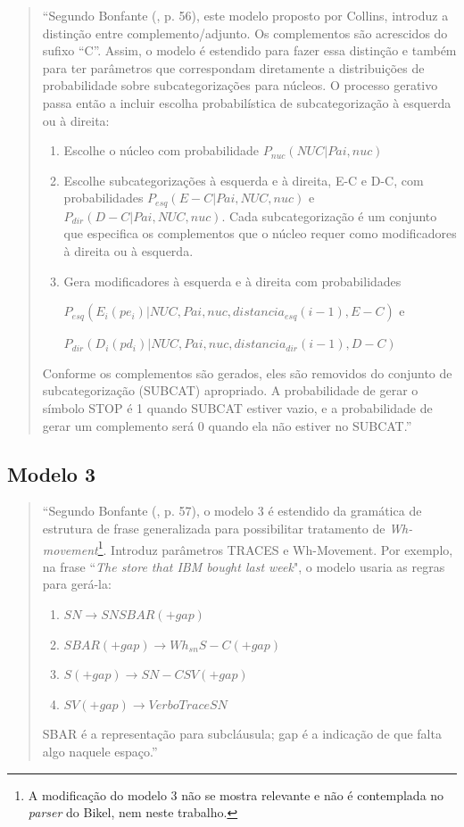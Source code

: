 \begin{quotation}
\footnotesize
``Segundo Bonfante (\cite{bonfante03}, p. 56), este modelo proposto por Collins, introduz a distinção entre complemento/adjunto. Os complementos  são acrescidos do sufixo ``C''. Assim, o modelo é estendido para fazer essa distinção e também para ter parâmetros que correspondam diretamente a distribuições de probabilidade sobre subcategorizações para núcleos.
O processo gerativo passa então a incluir escolha probabilística de subcategorização à esquerda ou à direita:

\begin{enumerate}
  \item Escolhe o núcleo com probabilidade $P_{nuc}(NUC|Pai, nuc)$
  \item Escolhe subcategorizações à esquerda e à direita, E-C e D-C, com probabilidades $P_{esq}(E-C|Pai,NUC, nuc)$ e $P_{dir}(D-C|Pai,NUC, nuc)$. Cada subcategorização é um conjunto que especifica os complementos que o núcleo requer como modificadores à direita ou à esquerda.
  \item Gera modificadores à esquerda e à direita com probabilidades

$P_{esq}(E_i(pe_i)|NUC, Pai, nuc, distancia_{esq}(i - 1),E - C)$ e

$P_{dir}(D_i(pd_i)|NUC, Pai, nuc, distancia_{dir}(i - 1),D - C)$

\end{enumerate}

Conforme os complementos são gerados, eles são removidos do conjunto de subcategorização (SUBCAT) apropriado. A probabilidade de gerar o símbolo STOP é 1 quando SUBCAT estiver vazio, e a probabilidade de gerar um complemento será 0 quando ela não estiver no SUBCAT.''
\end{quotation}

\subsection{Modelo 3}
\label{sub:modelo3}

\begin{quotation}
\footnotesize
``Segundo Bonfante (\cite{bonfante03}, p. 57), o modelo 3 é estendido da gramática de estrutura de frase generalizada para possibilitar tratamento de \emph{Wh-movement}\footnote{A modificação do modelo 3 não se mostra relevante e não é contemplada no \emph{parser} do Bikel, nem neste trabalho.}. Introduz parâmetros TRACES e Wh-Movement. Por exemplo, na frase ``\emph{The store that IBM bought last week}", o modelo usaria as regras para gerá-la:

\begin{enumerate}
  \item $SN \rightarrow SN SBAR(+gap)$
  \item $SBAR(+gap) \rightarrow Wh_{sn} S-C(+gap)$
  \item $S(+gap) \rightarrow SN-C SV(+gap)$
  \item $SV(+gap) \rightarrow Verbo Trace SN$
\end{enumerate}


SBAR é a representação para subcláusula; gap é a indicação de que falta algo naquele espaço.''
\end{quotation}

